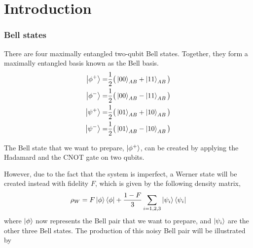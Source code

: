 \section{Introduction}

\subsubsection*{Bell states}

There are four maximally entangled two-qubit Bell states. Together, they form a maximally entangled basis known as the Bell basis.
\begin{align}\label{bellpairs}
  \ket{\phi^+} =& \frac{1}{2}\big(\ket{00}_{AB} + \ket{11}_{AB}\big) \\
  \ket{\phi^-} =& \frac{1}{2}\big(\ket{00}_{AB} - \ket{11}_{AB}\big) \\
  \ket{\psi^+} =& \frac{1}{2}\big(\ket{01}_{AB} + \ket{10}_{AB}\big) \\
  \ket{\psi^-} =& \frac{1}{2}\big(\ket{01}_{AB} - \ket{10}_{AB}\big)
\end{align}

The Bell state that we want to prepare, $\ket{\phi^+}$, can be created by applying the Hadamard and the CNOT gate on two qubits.

\begin{center}
\end{center}

However, due to the fact that the system is imperfect, a Werner state will be created instead with fidelity $F$, which is given by the following density matrix,
\begin{equation}\label{werner}
  \rho_W = F\ket{\phi}\bra{\phi} + \frac{1-F}{3}\sum_{i=1,2,3}\ket{\psi_i}\bra{\psi_i}
\end{equation}
where $\ket{\phi}$ now represents the Bell pair that we want to prepare, and $\ket{\psi_i}$ are the other three Bell states. The production of this noisy Bell pair will be illustrated by
\begin{center}
\end{center}

